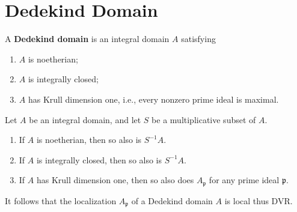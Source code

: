 \documentclass[12pt, oneside]{book}
\begin{document}
\section{Dedekind Domain}
\begin{definition}
    A \textbf{Dedekind domain} is an integral domain $A$ satisfying
    \begin{enumerate}[label=(\roman*)]
        \item
              $A$ is noetherian;
        \item
              $A$ is integrally closed;
        \item
              $A$ has Krull dimension one, i.e., every nonzero prime ideal is maximal.
    \end{enumerate}

\end{definition}


\begin{proposition}
    Let $A$ be an integral domain, and let $S$ be a multiplicative subset of $A$.
    \begin{enumerate}
        \item
              If $A$ is noetherian, then so also is $S^{-1} A$.
        \item
              If $A$ is integrally closed, then so also is $S^{-1} A$.
        \item
              If $A$ has Krull dimension one, then so also does $A_\mathfrak{p}$ for any prime ideal $\mathfrak{p}$.
    \end{enumerate}
    \begin{remark}
        It follows that the localization $A_{\mathfrak{p}}$ of a Dedekind domain $A$ is local thus DVR.
    \end{remark}
\end{proposition}
\end{document}
